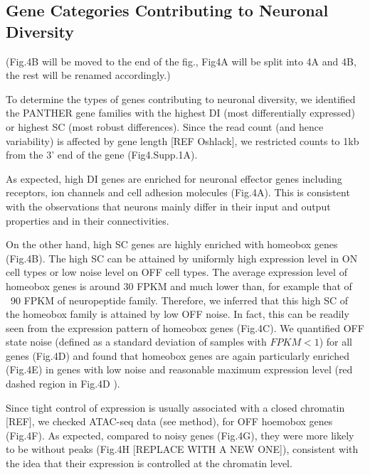 \subsection{Gene Categories Contributing to Neuronal Diversity}

(Fig.4B will be moved to the end of the fig., Fig4A will be split into 4A and 4B, the rest will be renamed accordingly.)

To determine the types of genes contributing to neuronal diversity, we identified the PANTHER gene families with the highest DI (most differentially expressed) or highest SC (most robust differences). Since the read count (and hence variability) is affected by gene length [REF Oshlack], we restricted counts to 1kb from the 3' end of the gene (Fig4.Supp.1A). 

As expected, high DI genes are enriched for neuronal effector genes including receptors, ion channels and cell adhesion molecules (Fig.4A). This is consistent with the observations that neurons mainly differ in their input and output properties and in their connectivities.

On the other hand, high SC genes are highly enriched with homeobox genes (Fig.4B). The high SC can be attained by uniformly high expression level in ON cell types or low noise level on OFF cell types. The average expression level of homeobox genes is around 30 FPKM and much lower than, for example that of ~90 FPKM of neuropeptide family. Therefore, we inferred that this high SC of the homeobox family is attained by low OFF noise. In fact, this can be readily seen from the expression pattern of homeobox genes (Fig.4C). We quantified OFF state noise (defined as a standard deviation of samples with $FPKM<1$) for all genes (Fig.4D) and found that homeobox genes are again particularly enriched (Fig.4E) in genes with low noise and reasonable maximum expression level (red dashed region in Fig.4D ).

Since tight control of expression is usually associated with a closed chromatin [REF], we checked ATAC-seq data (see method), for OFF hoemobox genes (Fig.4F). As expected, compared to noisy genes (Fig.4G), they were more likely to be without peaks (Fig.4H [REPLACE WITH A NEW ONE]), consistent with the idea that their expression is controlled at the chromatin level.

